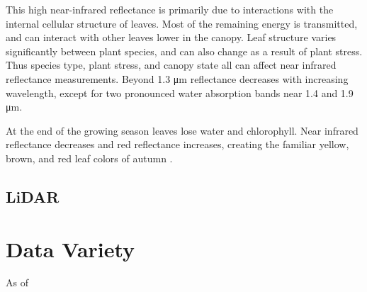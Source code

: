 This high near-infrared reflectance is primarily due to interactions with the internal cellular structure of leaves. Most of the remaining energy is transmitted, and can interact with other leaves lower in the canopy. Leaf structure varies significantly
between plant species, and can also change as a result of plant stress. Thus species type, plant stress, and canopy state all can affect near infrared reflectance measurements. Beyond 1.3 μm reflectance decreases with increasing wavelength, except for two pronounced water absorption bands near 1.4 and 1.9 μm.

At the end of the growing season leaves lose water and chlorophyll. Near infrared reflectance decreases and red reflectance increases, creating the familiar yellow, brown, and red leaf colors of autumn \citep{smith2006introduction}.

\subsection{LiDAR}



\section{Data Variety}

As of 


%
%

